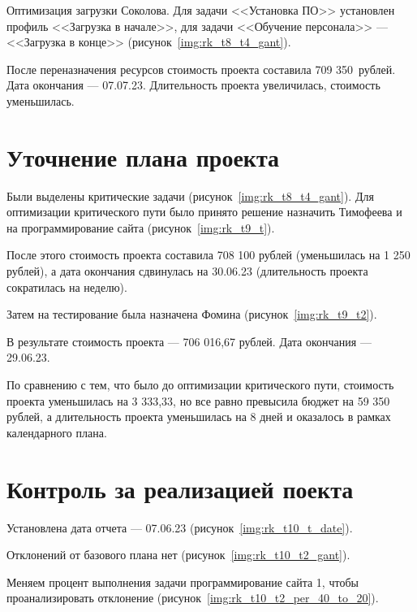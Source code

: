 Оптимизация загрузки Соколова. Для задачи <<Установка ПО>> установлен профиль <<Загрузка в начале>>, для задачи <<Обучение персонала>> --- <<Загрузка в конце>> (рисунок~\ref{img:rk_t8_t4_gant}).


После переназначения ресурсов стоимость проекта составила 709 350~рублей. Дата окончания --- 07.07.23. Длительность проекта увеличилась, стоимость уменьшилась.

\section{Уточнение плана проекта}

Были выделены критические задачи (рисунок~\ref{img:rk_t8_t4_gant}). Для оптимизации критического пути было принято решение назначить Тимофеева и на программирование сайта (рисунок~\ref{img:rk_t9_t}). 

После этого стоимость проекта составила 708 100 рублей (уменьшилась на 1 250 рублей), а дата окончания сдвинулась на 30.06.23 (длительность проекта сократилась на неделю).

Затем на тестирование была назначена Фомина (рисунок~\ref{img:rk_t9_t2}). 

В результате стоимость проекта --- 706 016,67 рублей. Дата окончания --- 29.06.23.

По сравнению с тем, что было до оптимизации критического пути, стоимость проекта уменьшилась на 3 333,33, но все равно превысила бюджет на 59 350 рублей, а длительность проекта уменьшилась на 8 дней и оказалось в рамках календарного плана.

\section{Контроль за реализацией поекта}

Установлена дата отчета --- 07.06.23 (рисунок~\ref{img:rk_t10_t_date}). 

Отклонений от базового плана нет (рисунок~\ref{img:rk_t10_t2_gant}). 

Меняем процент выполнения задачи программирование сайта 1, чтобы проанализировать отклонение (рисунок~\ref{img:rk_t10_t2_per_40_to_20}). 

